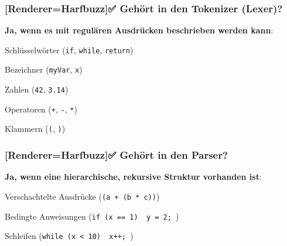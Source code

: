 \documentclass[a4paper]{article}
\newcommand{\uliji}[1]{
  {\setmainfont{Noto Color Emoji}[Renderer=Harfbuzz]{#1}}
}
\begin{document}
\subsubsection*{\uliji{✅} Gehört in den Tokenizer (Lexer)?}
\begin{itemize}
  \begin{item}
    \textbf{Ja, wenn es mit regulären Ausdrücken beschrieben werden kann}:
    \begin{itemize}
      \begin{item}
        Schlüsselwörter (\texttt{if}, \texttt{while}, \texttt{return})
      \end{item}
      \begin{item}
        Bezeichner (\texttt{myVar}, \texttt{x})
      \end{item}
      \begin{item}
        Zahlen (\texttt{42}, \texttt{3.14})
      \end{item}
      \begin{item}
        Operatoren (\texttt{+}, \texttt{-}, \texttt{*})
      \end{item}
      \begin{item}
        Klammern (\texttt{(}, \texttt{)})
      \end{item}
    \end{itemize}
  \end{item}
\end{itemize}
\subsubsection*{\uliji{✅} Gehört in den Parser?}
\begin{itemize}
  \begin{item}
    \textbf{Ja, wenn eine hierarchische, rekursive Struktur vorhanden ist}:
    \begin{itemize}
      \begin{item}
        Verschachtelte Ausdrücke (\texttt{(a + (b * c))})
      \end{item}
      \begin{item}
        Bedingte Anweisungen (\texttt{if (x == 1) { y = 2; }})
      \end{item}
      \begin{item}
        Schleifen (\texttt{while (x < 10) { x++; }})
      \end{item}
    \end{itemize}
  \end{item}
\end{itemize}
\end{document}
